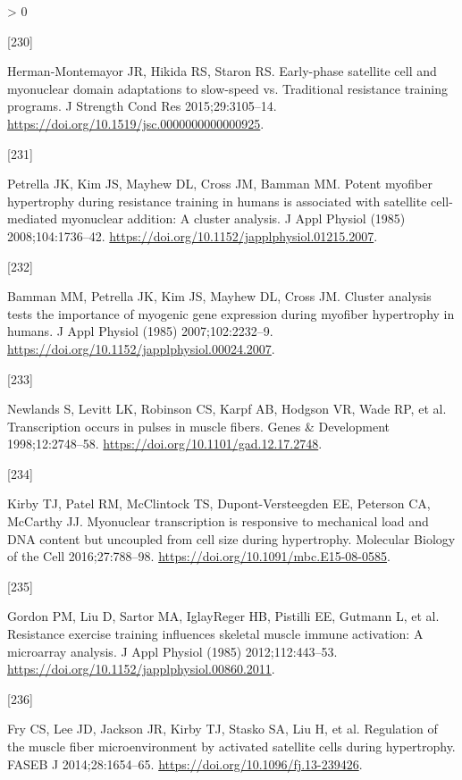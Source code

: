\documentclass[twoside,10pt]{gihclass} %
\newlength{\cslhangindent}
\newlength{\csllabelwidth}
\newenvironment{CSLReferences}[3] %
 {%
  \setlength{\parindent}{0pt}
  \ifodd #1 \everypar{\setlength{\hangindent}{\cslhangindent}}\ignorespaces\fi
  \ifnum #2 > 0
  \setlength{\parskip}{#2\baselineskip}
  \fi
 }%
 {}
\newcommand{\CSLLeftMargin}[1]{\parbox[t]{\maxof{\widthof{#1}}{\csllabelwidth}}{#1}}
\newcommand{\CSLRightInline}[1]{\parbox[t]{\linewidth}{#1}}
\begin{document}
\begin{CSLReferences}{0}{0}
\leavevmode\hypertarget{ref-RN2874}{}%
\CSLLeftMargin{{[}230{]} }
\CSLRightInline{Herman-Montemayor JR, Hikida RS, Staron RS. Early-phase satellite cell and myonuclear domain adaptations to slow-speed vs. Traditional resistance training programs. J Strength Cond Res 2015;29:3105--14. \url{https://doi.org/10.1519/jsc.0000000000000925}.}

\leavevmode\hypertarget{ref-RN2868}{}%
\CSLLeftMargin{{[}231{]} }
\CSLRightInline{Petrella JK, Kim JS, Mayhew DL, Cross JM, Bamman MM. Potent myofiber hypertrophy during resistance training in humans is associated with satellite cell-mediated myonuclear addition: A cluster analysis. J Appl Physiol (1985) 2008;104:1736--42. \url{https://doi.org/10.1152/japplphysiol.01215.2007}.}

\leavevmode\hypertarget{ref-RN765}{}%
\CSLLeftMargin{{[}232{]} }
\CSLRightInline{Bamman MM, Petrella JK, Kim JS, Mayhew DL, Cross JM. Cluster analysis tests the importance of myogenic gene expression during myofiber hypertrophy in humans. J Appl Physiol (1985) 2007;102:2232--9. \url{https://doi.org/10.1152/japplphysiol.00024.2007}.}

\leavevmode\hypertarget{ref-RN2618}{}%
\CSLLeftMargin{{[}233{]} }
\CSLRightInline{Newlands S, Levitt LK, Robinson CS, Karpf AB, Hodgson VR, Wade RP, et al. Transcription occurs in pulses in muscle fibers. Genes \& Development 1998;12:2748--58. \url{https://doi.org/10.1101/gad.12.17.2748}.}

\leavevmode\hypertarget{ref-RN2616}{}%
\CSLLeftMargin{{[}234{]} }
\CSLRightInline{Kirby TJ, Patel RM, McClintock TS, Dupont-Versteegden EE, Peterson CA, McCarthy JJ. Myonuclear transcription is responsive to mechanical load and DNA content but uncoupled from cell size during hypertrophy. Molecular Biology of the Cell 2016;27:788--98. \url{https://doi.org/10.1091/mbc.E15-08-0585}.}

\leavevmode\hypertarget{ref-RN1825}{}%
\CSLLeftMargin{{[}235{]} }
\CSLRightInline{Gordon PM, Liu D, Sartor MA, IglayReger HB, Pistilli EE, Gutmann L, et al. Resistance exercise training influences skeletal muscle immune activation: A microarray analysis. J Appl Physiol (1985) 2012;112:443--53. \url{https://doi.org/10.1152/japplphysiol.00860.2011}.}

\leavevmode\hypertarget{ref-RN1354}{}%
\CSLLeftMargin{{[}236{]} }
\CSLRightInline{Fry CS, Lee JD, Jackson JR, Kirby TJ, Stasko SA, Liu H, et al. Regulation of the muscle fiber microenvironment by activated satellite cells during hypertrophy. FASEB J 2014;28:1654--65. \url{https://doi.org/10.1096/fj.13-239426}.}


\end{CSLReferences}
\end{document}
